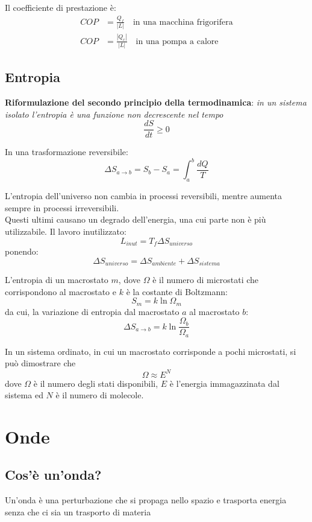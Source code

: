 \documentclass[12pt]{article}
\begin{document}
Il coefficiente di prestazione è:
\begin{align*}
    COP &= \frac{Q_f}{|L|} \hspace{1em} \text{in una macchina frigorifera} \\
    COP &= \frac{|Q_c|}{|L|} \hspace{1em} \text{in una pompa a calore}
\end{align*}

\subsection{Entropia}
\textbf{Riformulazione del secondo principio della termodinamica}: \textit{in un sistema isolato l'entropia è una funzione non decrescente nel tempo}
$$ \frac{dS}{dt} \ge 0 $$

In una trasformazione reversibile:
$$ \Delta S_{a\rightarrow b} = S_b - S_a = \int_{a}^{b} \frac{dQ}{T} $$

L'entropia dell'universo non cambia in processi reversibili, mentre aumenta sempre in processi irreversibili. \\
Questi ultimi causano un degrado dell'energia, una cui parte non è più utilizzabile. Il lavoro inutilizzato:
$$ L_{inut} = T_f \Delta S_{universo} $$
ponendo:
$$ \Delta S_{universo} = \Delta S_{ambiente} + \Delta S_{sistema} $$

L'entropia di un macrostato $m$, dove $\Omega$ è il numero di microstati che corrispondono al macrostato e $k$ è la costante di Boltzmann:
$$ S_m = k\ln{\Omega_m} $$
da cui, la variazione di entropia dal macrostato $a$ al macrostato $b$:
$$ \Delta S_{a\rightarrow b} = k \ln{\frac{\Omega_b}{\Omega_a}} $$

In un sistema ordinato, in cui un macrostato corrisponde a pochi microstati, si può dimostrare che
$$ \Omega \approx E^N $$
dove $\Omega$ è il numero degli stati disponibili, $E$ è l'energia immagazzinata dal sistema ed $N$ è il numero di molecole.

\newpage
\section{Onde}

\subsection{Cos'è un'onda?}
Un'onda è una perturbazione che si propaga nello spazio e trasporta energia senza che ci sia un trasporto di materia
\end{document}
